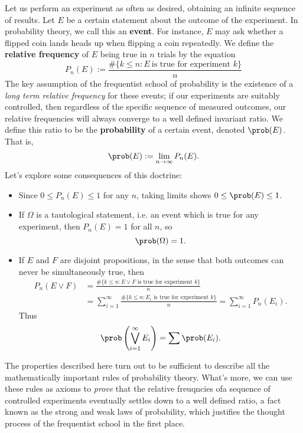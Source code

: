 Let us perform an experiment as often as desired, obtaining an infinite sequence of results. Let $E$ be a certain statement about the outcome of the experiment. In probability theory, we call this an {\bf event}. For instance, $E$ may ask whether a flipped coin lands heads up when flipping a coin repeatedly. We define the {\bf relative frequency} of $E$ being true in $n$ trials by the equation
%
\[ P_n(E) := \frac{\# \{ k \leq n : E\ \text{is true for experiment $k$} \}}{n} \]
%
The key assumption of the frequentist school of probability is the existence of a {\it long term relative frequency} for these events; if our experiments are suitably controlled, then regardless of the specific sequence of measured outcomes, our relative frequencies will always converge to a well defined invariant ratio. We define this ratio to be the {\bf probability} of a certain event, denoted $\prob(E)$. That is,
%
\[ \prob(E) := \lim_{n \to \infty} P_n(E). \]
%
Let's explore some consequences of this doctrine:
%
\begin{itemize}
    \item Since $0 \leq P_n(E) \leq 1$ for any $n$, taking limits shows $0 \leq \prob(E) \leq 1$.

    \item If $\Omega$ is a tautological statement, i.e. an event which is true for any experiment, then $P_n(E) = 1$ for all $n$, so
    \[ \prob(\Omega) = 1. \]

    \item If $E$ and $F$ are disjoint propositions, in the sense that both outcomes can never be simultaneously true, then 
    \begin{align*}
        P_n \left( E \vee F \right) &= \frac{\# \{ k \leq n : \text{$E \vee F$ is true for experiment $k$} \}}{n}\\
        &= \sum_{i = 1}^\infty \frac{\# \{ k \leq n : \text{$E_i$ is true for experiment $k$} \}}{n} = \sum_{i = 1}^\infty P_n(E_i).
    \end{align*}
    Thus
    \[ \prob \left( \bigvee_{i = 1}^\infty E_i \right) = \sum \prob(E_i). \]
\end{itemize}
%
The properties described here turn out to be sufficient to describe all the mathematically important rules of probability theory. What's more, we can use these rules as axioms to {\it prove} that the relative freuqncies ofa sequence of controlled experiments eventually settles down to a well defined ratio, a fact known as the strong and weak laws of probability, which justifies the thought process of the frequentist school in the first place.

